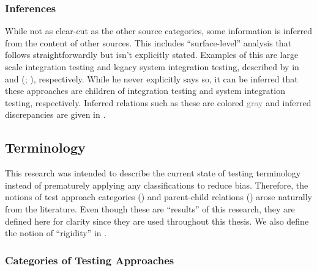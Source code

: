     \subsubsection{Inferences}
    \label{infers}
    While not as clear-cut as the other source categories, some information is
    inferred from the content of other sources. This includes ``surface-level''
    analysis that follows straightforwardly but isn't explicitly stated.
    Examples of this are large scale integration testing and legacy system
    integration testing, described by \citeauthor{Gerrard2000a} in
    \citeyearpar[p.~30]{Gerrard2000b} and (\citeyear[Tab.~2]{Gerrard2000a};
    \citeyear[Tab.~1]{Gerrard2000b}), respectively. While he never explicitly
    says so, it can be inferred that these approaches are children of
    integration testing and system integration testing, respectively. Inferred
    relations such as these are colored \textcolor{gray}{gray} and inferred
    discrepancies are given in .
\fi

\ifnotpaper\else\ieeeTestTermsTable{}\fi

\subsection{Terminology}

This research was intended to describe the current state of testing
terminology instead of prematurely applying any classifications to reduce bias.
Therefore, the notions of test approach categories ()
and parent-child relations ()
arose naturally from the literature. Even though these are ``results'' of this
research, they are defined here for clarity since they are used throughout this
thesis. We also define the notion of ``rigidity'' in .

\subsubsection{Categories of Testing Approaches}
\label{categories-observ}

